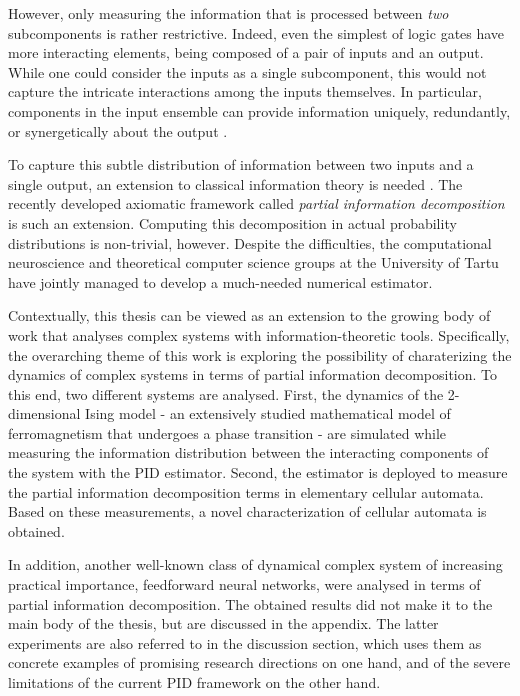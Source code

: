 \documentclass[12pt]{article}
\begin{document}
However, only measuring the information that is processed between \textit{two} subcomponents is rather restrictive. Indeed, even the simplest of logic gates have more interacting elements, being composed of a pair of inputs and an output. While one could consider the inputs as a single subcomponent, this would not capture the intricate interactions among the inputs themselves. In particular, components in the input ensemble can provide information uniquely, redundantly, or synergetically about the output \cite{williams-beer}.  

To capture this subtle distribution of information between two inputs and a single output, an extension to classical information theory is needed \cite{williams-beer}. The recently developed axiomatic framework called \textit{partial information decomposition} \cite{bertschinger} is such an extension. Computing this decomposition in actual probability distributions is non-trivial, however. Despite the difficulties, the computational neuroscience and theoretical computer science groups at the University of Tartu have jointly managed to develop a much-needed numerical estimator. 

Contextually, this thesis can be viewed as an extension to the growing body of work that analyses complex systems with information-theoretic tools. Specifically, the overarching theme of this work is exploring the possibility of charaterizing the dynamics of complex systems in terms of partial information decomposition. To this end, two different systems are analysed. First, the dynamics of the 2-dimensional Ising model - an extensively studied mathematical model of ferromagnetism that undergoes a phase transition - are simulated while measuring the information distribution between the interacting components of the system with the PID estimator. Second, the estimator is deployed to measure the partial information decomposition terms in elementary cellular automata. Based on these measurements, a novel characterization of cellular automata is obtained.

In addition, another well-known class of dynamical complex system of increasing practical importance, feedforward neural networks,  were analysed in terms of partial information decomposition. The obtained results did not make it to the main body of the thesis, but are discussed in the appendix. The latter experiments are also referred to in the discussion section, which uses them as concrete examples of promising research directions on one hand, and of the severe limitations of the current PID framework on the other hand. 
\end{document}
